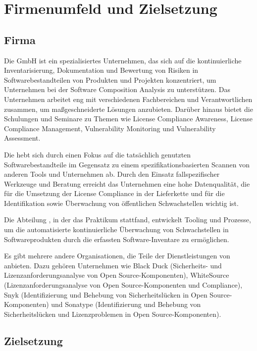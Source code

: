 

\chapter{Firmenumfeld und Zielsetzung} \label{ch:firmenumfeld-zielsetzung}


\section{Firma} \label{sec:firma-beschreibung}

Die {\metaeffekt} GmbH ist ein spezialisiertes Unternehmen, das sich auf die kontinuierliche Inventarisierung, Dokumentation und Bewertung von Risiken in Softwarebestandteilen von Produkten und Projekten konzentriert, um Unternehmen bei der Software Composition Analysis zu unterstützen.
Das Unternehmen arbeitet eng mit verschiedenen Fachbereichen und Verantwortlichen zusammen, um maßgeschneiderte Lösungen anzubieten.
Darüber hinaus bietet die {\metaeffekt} Schulungen und Seminare zu Themen wie License Compliance Awareness, License Compliance Management, Vulnerability Monitoring und Vulnerability Assessment.

Die {\metaeffekt} hebt sich durch einen Fokus auf die tatsächlich genutzten Softwarebestandteile im Gegensatz zu einem spezifikationsbasierten Scannen von anderen Tools und Unternehmen ab.
Durch den Einsatz fallspezifischer Werkzeuge und Beratung erreicht das Unternehmen eine hohe Datenqualität, die für die Umsetzung der License Compliance in der Lieferkette und für die Identifikation sowie Überwachung von öffentlichen Schwachstellen wichtig ist.

Die Abteilung , in der das Praktikum stattfand, entwickelt Tooling und Prozesse, um die automatisierte kontinuierliche Überwachung von Schwachstellen in Softwareprodukten durch die erfassten Software-Inventare zu ermöglichen.

Es gibt mehrere andere Organisationen, die Teile der Dienstleistungen von {\metaeffekt} anbieten.
Dazu gehören Unternehmen wie
Black Duck (Sicherheits- und Lizenzanforderungsanalyse von Open Source-Komponenten),
WhiteSource (Lizenzanforderungsanalyse von Open Source-Komponenten und Compliance),
Snyk (Identifizierung und Behebung von Sicherheitslücken in Open Source-Komponenten) und
Sonatype (Identifizierung und Behebung von Sicherheitslücken und Lizenzproblemen in Open Source-Komponenten).


\section{Zielsetzung} \label{sec:zielsetzung-des-praktikums}

